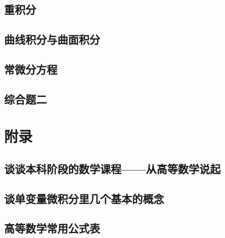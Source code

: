 \documentclass[openany,customfont=true]{HTNotes}
\begin{document}
  \chapter{重积分}\label{cha:8}

  \chapter{曲线积分与曲面积分}\label{cha:9}

  \chapter{常微分方程}\label{cha:10}
    

  \chapter*{综合题二}
    

\part{附录}
  \chapter{谈谈本科阶段的数学课程——从高等数学说起}
    

  \chapter{谈单变量微积分里几个基本的概念}
    

  \chapter{高等数学常用公式表}
    

\newpage
\backmatter
\makebackcover
\end{document}
